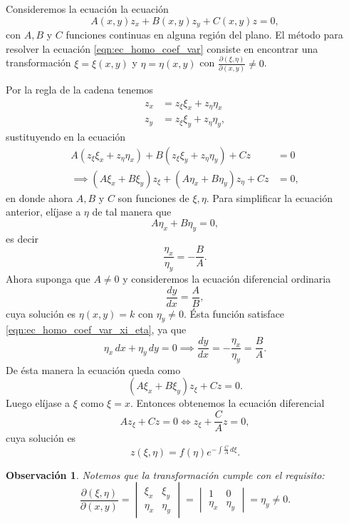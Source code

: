 \documentclass[11pt,letterpaper]{report}
\newtheorem{obs}[defn]{Observación}
\newcommand\<{\langle}
\renewcommand\>{\rangle}
\begin{document}
Consideremos la ecuación la ecuación
\begin{equation}
  \label{eqn:ec_homo_coef_var}
  A(x,y) z_x + B(x,y) z_y + C(x,y) z = 0,
\end{equation} 
con $A,B$ y $C$ funciones continuas en alguna región del
plano. El método para resolver la ecuación
\ref{eqn:ec_homo_coef_var} consiste en encontrar una
transformación $\xi = \xi(x,y)$ y  $\eta = \eta(x,y)$ con
$\frac{\partial(\xi,\eta)}{\partial(x,y)} \neq 0$.

Por la regla de la cadena tenemos
\begin{align*}
  z_x &= z_\xi \xi_x + z_\eta \eta_x\\
  z_y &= z_\xi \xi_y + z_\eta \eta_y,
\end{align*}
sustituyendo en la ecuación
\begin{align*}
  A(z_\xi \xi_x + z_\eta \eta_x) + B(z_\xi \xi_y + z_\eta
  \eta_y) + Cz &= 0\\
  \implies (A\xi_x + B \xi_y)z_\xi + (A\eta_x +
  B\eta_y)z_\eta + Cz &= 0,
\end{align*}
en donde ahora $A,B$ y $C$ son funciones de $\xi, \eta$.
Para simplificar la ecuación anterior, elíjase a $\eta$ de
tal manera que
\[
A\eta_x + B\eta_y = 0,
\] 
es decir
\begin{equation}
  \label{eqn:ec_homo_coef_var_xi_eta}
  \frac{\eta_x}{\eta_y} = -\frac{B}{A}.
\end{equation} 
Ahora suponga que $A \neq 0$ y consideremos la ecuación
diferencial ordinaria
\[
\frac{dy}{dx} = \frac{A}{B},
\] 
cuya solución es $\eta(x,y) = k$ con $\eta_y \neq 0$. Ésta
función satisface \ref{eqn:ec_homo_coef_var_xi_eta}, ya que
\[
\eta_x \, dx + \eta_y \, dy = 0 \implies \frac{dy}{dx} =
-\frac{\eta_x}{\eta_y} = \frac{B}{A}.
\] 
De ésta manera la ecuación queda como
\[
  (A \xi_x + B \xi_y)z_\xi + C z = 0.
\] 
Luego elíjase a $\xi$ como $\xi = x$. Entonces obtenemos la
ecuación diferencial
\[
A z_\xi + C z = 0 \iff z_\xi + \frac{C}{A} z = 0,
\]
cuya solución es
\[
z(\xi,\eta) = f(\eta) e^{-\int \frac{C}{A} \, d\xi}
.\] 
\begin{obs}
  Notemos que la transformación cumple con el requisito:
  \[
  \frac{\partial(\xi,\eta)}{\partial(x,y)} = 
  \begin{vmatrix}
    \xi_x & \xi_y\\
    \eta_x & \eta_y
  \end{vmatrix} = 
  \begin{vmatrix}
    1 & 0\\
    \eta_x & \eta_y
  \end{vmatrix} = \eta_y \neq 0
  .\] 
\end{obs}
\end{document}
